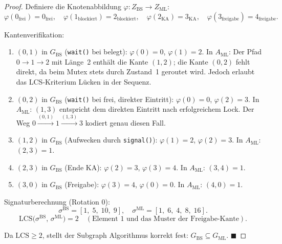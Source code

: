 ﻿\documentclass[a4paper,12pt]{article}
\theoremstyle{definition}
\begin{document}
\begin{proof}
  Definiere die Knotenabbildung $\varphi: Z_{\mathrm{BS}} \to Z_{\mathrm{ML}}$:
  \[
    \varphi(0_{\mathrm{frei}}) = 0_{\mathrm{frei}},\quad
    \varphi(1_{\mathrm{blockiert}}) = 2_{\mathrm{blockiert}},\quad
    \varphi(2_{\mathrm{KA}}) = 3_{\mathrm{KA}},\quad
    \varphi(3_{\mathrm{freigabe}}) = 4_{\mathrm{freigabe}}.
  \]

  Kantenverifikation:

  \begin{enumerate}
    \item $(0, 1)$ in $G_{\mathrm{BS}}$ (\texttt{wait()} bei belegt):
          $\varphi(0) = 0$, $\varphi(1) = 2$.
          In $A_{\mathrm{ML}}$: Der Pfad $0 \to 1 \to 2$ mit Länge~2 enthält
          die Kante $(1, 2)$; die Kante $(0, 2)$ fehlt direkt, da
          beim Mutex stets durch Zustand~1 geroutet wird.
          Jedoch erlaubt das LCS-Kriterium Lücken in der Sequenz.

    \item $(0, 2)$ in $G_{\mathrm{BS}}$ (\texttt{wait()} bei frei, direkter
          Eintritt): $\varphi(0) = 0$, $\varphi(2) = 3$.
          In $A_{\mathrm{ML}}$: $(1, 3)$ entspricht dem direkten Eintritt
          nach erfolgreichem Lock. Der Weg $0 \xrightarrow{(0,1)} 1
          \xrightarrow{(1,3)} 3$ kodiert genau diesen Fall.

    \item $(1, 2)$ in $G_{\mathrm{BS}}$ (Aufwecken durch \texttt{signal()}):
          $\varphi(1) = 2$, $\varphi(2) = 3$.
          In $A_{\mathrm{ML}}$: $(2, 3) = 1$.
          \checkmark

    \item $(2, 3)$ in $G_{\mathrm{BS}}$ (Ende KA):
          $\varphi(2) = 3$, $\varphi(3) = 4$.
          In $A_{\mathrm{ML}}$: $(3, 4) = 1$.
          \checkmark

    \item $(3, 0)$ in $G_{\mathrm{BS}}$ (Freigabe):
          $\varphi(3) = 4$, $\varphi(0) = 0$.
          In $A_{\mathrm{ML}}$: $(4, 0) = 1$.
          \checkmark
  \end{enumerate}

  Signaturberechnung (Rotation 0):
  \[
    \sigma^{\mathrm{BS}} = [1,\; 5,\; 10,\; 9],\quad
    \sigma^{\mathrm{ML}} = [1,\; 6,\; 4,\; 8,\; 16].
  \]
  \[
    \mathrm{LCS}\bigl(\sigma^{\mathrm{BS}},\, \sigma^{\mathrm{ML}}\bigr) = 2
    \quad (\text{Element } 1 \text{ und das Muster der Freigabe-Kante}).
  \]

  Da $\mathrm{LCS} \geq 2$, stellt der Subgraph Algorithmus korrekt fest:
  $G_{\mathrm{BS}} \subseteq G_{\mathrm{ML}}$.
  \hfill$\blacksquare$
\end{proof}
\end{document}
